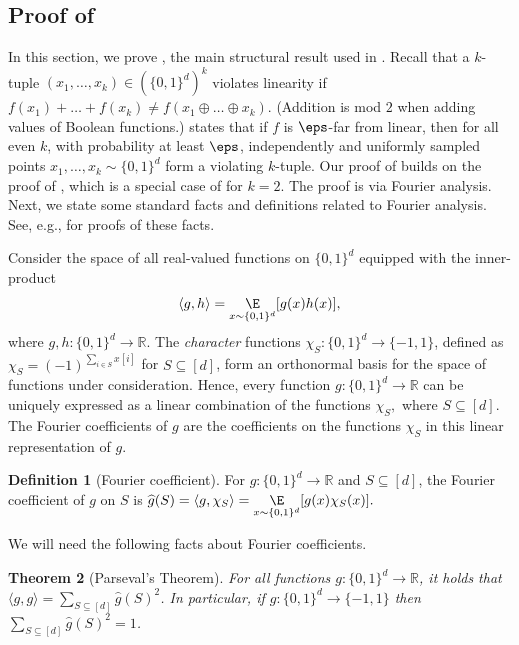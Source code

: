 \documentclass[11pt]{article}
\numberwithin{equation}{section}
\newtheorem{theorem}{Theorem}[section]
\theoremstyle{definition}
\newtheorem{definition}[theorem]{Definition}
\theoremstyle{plain}
\newcommand{\R}{\mathbb R}
\begin{document}
\subsection{Proof of }\label{sec:fourier}

 In this section, we prove , the main structural result used in . Recall that a $k$-tuple $(x_1, \dots, x_k) \in (\{0,1\}^d)^k$ violates linearity if $f(x_1) + \dots + f(x_k) \neq f(x_1 \oplus \dots \oplus x_k)$. (Addition is mod $2$ when adding values of Boolean functions.)  states that if $f$ is $\eps$-far from linear, then for all even $k$, with probability at least $\eps$, independently and uniformly sampled points $x_1, \dots, x_k \sim \{0,1\}^d$ form a violating $k$-tuple. 
Our proof of  
builds on the proof of \cite[Theorem 1.2]{BellareCHKS96}, which is a special case of  for $k=2$. The proof is via Fourier analysis. Next, we state some standard facts and definitions related to Fourier analysis. See, e.g., \cite{OD1} for proofs of these facts. 

Consider the space of all real-valued functions on $\{0,1\}^d$ equipped with the inner-product 
\[\langle g, h \rangle = \underset{x\sim \{0,1\}^d}{\E}[g(x)h(x)],\]
where $g, h \colon \{0,1\}^d \to \R$. The \emph{character} functions $\chi_S \colon \{0, 1\}^d \to \{-1,1\}$, defined as $\chi_S = (-1)^{\sum_{i \in S} x[i]}$ for $S \subseteq [d]$, form an orthonormal basis for the space of functions under consideration. Hence, every function $g:\{0,1\}^d\to\R$ can be uniquely expressed as a linear combination of the functions $\chi_S,$ where $S\subseteq [d]$. The Fourier coefficients of $g$ are the coefficients on the functions  $\chi_S$ in this linear representation of $g$.  

\begin{definition}[Fourier coefficient]
For $g \colon \{0,1\}^d \to \R$ and $S \subseteq [d]$, the Fourier coefficient of $g$ on $S$ is 
$
    \widehat{g}(S) = \langle g, \chi_S \rangle = \underset{x\sim \{0,1\}^d}{\E}[g(x)\chi_S(x)].
$
\end{definition}

We will need the following facts about Fourier coefficients. 

\begin{theorem}[Parseval's Theorem]\label{thm:parseval}
For all functions $g\colon\{0,1\}^d \to \R$, it holds that $ \langle g,g\rangle =  \sum_{S\subseteq [d]} \widehat{g}(S)^2$.
%
%
%
In particular, if $g\colon\{0,1\}^d \to \{-1,1\}$ then $ \sum_{S\subseteq [d]} \widehat{g}(S)^2=1$. 
\end{theorem}
\end{document}
